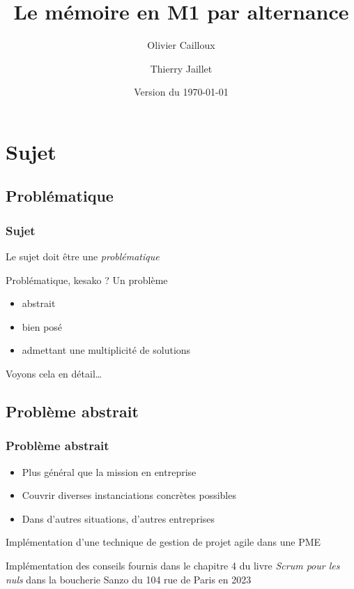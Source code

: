 \documentclass[french]{beamer}
\title{Le mémoire en M1 par alternance}
\author{Olivier Cailloux \and Thierry Jaillet}
\institute[LAMSADE]{\inst{1} LAMSADE, Université Paris-Dauphine}
\date{Version du \today}
\begin{document}
\begin{frame}[plain]
	\titlepage
\end{frame}
\addtocounter{framenumber}{-1}

\section{Sujet}
\subsection{Problématique}
\begin{frame}
	\frametitle{Sujet}
	Le sujet doit être une \emph{problématique}
	\begin{block}{Problématique, kesako ?}
		Un problème
		\begin{itemize}
			\item abstrait
			\item bien posé
			\item admettant une multiplicité de solutions
		\end{itemize}
	\end{block}
	Voyons cela en détail…
\end{frame}

\subsection{Problème abstrait}
\begin{frame}
	\frametitle{Problème abstrait}
	\begin{itemize}
		\item Plus général que la mission en entreprise
		\item Couvrir diverses instanciations concrètes possibles
		\item Dans d’autres situations, d’autres entreprises
	\end{itemize}
	\begin{example}
		Implémentation d’une technique de gestion de projet agile dans une PME
	\end{example}
	\begin{example}
		Implémentation des conseils fournis dans le chapitre 4 du livre \emph{Scrum pour les nuls} dans la boucherie Sanzo du 104 rue de Paris en 2023
	\end{example}
\end{frame}
\end{document}
